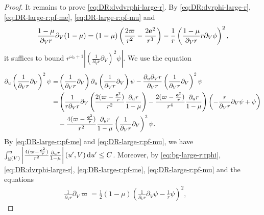 \documentclass[10pt, reqno]{amsart}
\theoremstyle{definition}
\theoremstyle{remark}
\theoremstyle{conjecture}
\numberwithin{equation}{section}
\newcommand{\ud}{\mathrm{d}}
\newcommand{\rd}{\partial}
\newcommand{\0}{\emptyset}
\newcommand{\omg}{\omega}
\newcommand{\bfe}{{\bf e}}
\newcommand{\e}{\bfe}							%
\newcommand{\Abs}[1]{\left\vert #1 \right\vert}
\begin{document}
\begin{proof}
It remains to prove \eqref{eq:DR:dvdvrphi-large-r}. By \eqref{eq:DR:dvrphi-large-r}, \eqref{eq:DR-large-r:pf-me}, \eqref{eq:DR-large-r:pf-mu} and
\begin{equation*}
	\frac{1-\mu}{\rd_{V} r} \rd_{V}(1-\mu)
	= (1-\mu) \left(\frac{2 \varpi}{r^{2}} - \frac{2 \e^{2}}{r^{3}}\right) - \frac{1}{r} \left( \frac{1-\mu}{\rd_{V} r} r \rd_{V} \phi \right)^{2} ,
\end{equation*}
it suffices to bound $r^{\omg_{0} + 1} \Abs{\left(\frac{1}{\rd_{V} r} \rd_{V}\right)^{2} \psi}$. We use the equation
\begin{align*}
	\rd_{u} \left(\frac{1}{\rd_{V} r} \rd_{V} \right)^{2} \psi 
	=& \left(\frac{1}{\rd_{V} r} \rd_{V} \right) \rd_{u} \left(\frac{1}{\rd_{V} r} \rd_{V} \right) \psi 
		- \frac{\rd_{u} \rd_{V} r} {\rd_{V} r}\left(\frac{1}{\rd_{V} r} \rd_{V} \right)^{2} \psi \\
	= &\left(\frac{1}{r \rd_{V} r} \rd_{V} \left( \frac{2 (\varpi - \frac{\e^{2}}{r}) } {r^{2}} \frac{\rd_{u} r}{1-\mu} \right) - \frac{2 (\varpi - \frac{\e^{2}}{r}) } {r^{4}} \frac{\rd_{u} r}{1-\mu} \right) \left(- \frac{r}{\rd_{V} r} \rd_{V} \psi +  \psi \right) \\
		& - \frac{4 (\varpi - \frac{\e^{2}}{r}) } {r^{2}} \frac{\rd_{u} r}{1-\mu} \left(\frac{1}{\rd_{V} r} \rd_{V} \right)^{2} \psi .
\end{align*}
By \eqref{eq:DR-large-r:pf-me} and \eqref{eq:DR-large-r:pf-mu}, we have $\int_{\underline{u}(V)}^{u} \Abs{\frac{4 (\varpi - \frac{\e^{2}}{r}) } {r^{2}} \frac{\rd_{u} r}{1-\mu}} (u', V) \, \ud u' \leq C$. Moreover, by \eqref{eq:bg-large-r:rphi}, \eqref{eq:DR:dvrphi-large-r}, \eqref{eq:DR-large-r:pf-me}, \eqref{eq:DR-large-r:pf-mu} and the equations
\begin{align*}
\frac{1}{\rd_{V} r} \rd_{V} \varpi
= \frac{1}{2} (1-\mu) \left( \frac{1}{\rd_{V} r} \rd_{V} \psi - \frac{1}{r} \psi \right)^{2}, \qquad

\end{align*}
\end{proof}
\end{document}

